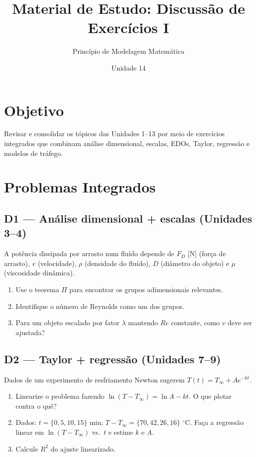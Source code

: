 \documentclass[12pt,a4paper]{article}
\title{Material de Estudo: Discuss\~ao de Exerc\'icios I}
\author{Princ\'ipio de Modelagem Matem\'atica}
\date{Unidade 14}
\begin{document}
\maketitle

\section*{Objetivo}
Revisar e consolidar os t\'opicos das Unidades 1--13 por meio de exerc\'icios integrados que combinam an\'alise dimensional, escalas, EDOs, Taylor, regress\~ao e modelos de tr\'afego.

\section*{Problemas Integrados}

\subsection*{D1 --- An\'alise dimensional + escalas (Unidades 3--4)}
A pot\^encia dissipada por arrasto num flu\'ido depende de $F_D$ [N] (for\c{c}a de arrasto), $v$ (velocidade), $\rho$ (densidade do flu\'ido), $D$ (di\^ametro do objeto) e $\mu$ (viscosidade din\^amica).
\begin{enumerate}
  \item[$a.$] Use o teorema $\Pi$ para encontrar os grupos adimensionais relevantes.
  \item[$b.$] Identifique o n\'umero de Reynolds como um dos grupos.
  \item[$c.$] Para um objeto escalado por fator $\lambda$ mantendo $Re$ constante, como $v$ deve ser ajustada?
\end{enumerate}

\subsection*{D2 --- Taylor + regress\~ao (Unidades 7--9)}
Dados de um experimento de resfriamento Newton sugerem $T(t) = T_\infty + A e^{-kt}$.
\begin{enumerate}
  \item[$a.$] Linearize o problema fazendo $\ln(T - T_\infty) = \ln A - kt$. O que plotar contra o qu\^e?
  \item[$b.$] Dados: $t = \{0, 5, 10, 15\}$ min; $T-T_\infty = \{70, 42, 26, 16\}$ $^\circ$C. Fa\c{c}a a regress\~ao linear em $\ln(T-T_\infty)$ vs.\ $t$ e estime $k$ e $A$.
  \item[$c.$] Calcule $R^2$ do ajuste linearizado.
\end{enumerate}
\end{document}
